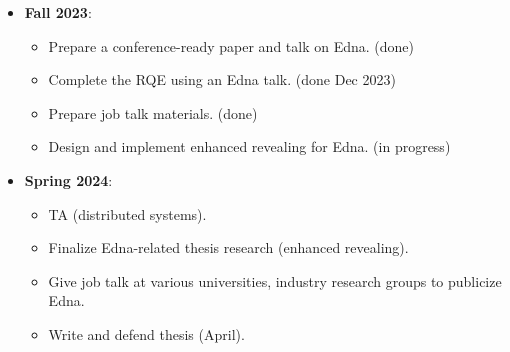 \begin{itemize}
\item \textbf{Fall 2023}: 
    \begin{itemize}
        \item Prepare a conference-ready paper and talk on Edna. (done)
        \item Complete the RQE using an Edna talk. (done Dec 2023)
        \item Prepare job talk materials. (done)
        \item Design and implement enhanced revealing for Edna. (in progress)
    \end{itemize}
\item \textbf{Spring 2024}: 
    \begin{itemize}
        \item TA (distributed systems).
        \item Finalize Edna-related thesis research (enhanced revealing).
        \item Give job talk at various universities, industry research groups to
            publicize Edna.
        \item Write and defend thesis (April).
    \end{itemize}
\end{itemize}
